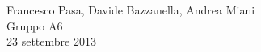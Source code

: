 \begin{center}

	\vspace{0.5cm}
     	\textsc{\LARGE }
	\vspace{0.5cm}

      	{\large Francesco Pasa, Davide Bazzanella, Andrea Miani} \\
		{\large Gruppo A6} \\
	
	\vspace{0.2cm}
      	{\large 23 settembre 2013}
    
    \vspace{1cm}

\end{center}
